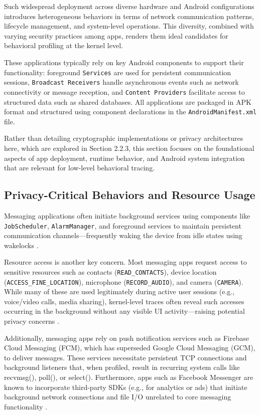 \documentclass[a4paper,12pt]{report}
\begin{document}
Such widespread deployment across diverse hardware and Android configurations introduces heterogeneous behaviors in terms of network communication patterns, lifecycle management, and system-level operations. This diversity, combined with varying security practices among apps, renders them ideal candidates for behavioral profiling at the kernel level.

These applications typically rely on key Android components to support their functionality: foreground \texttt{Services} are used for persistent communication sessions, \texttt{Broadcast Receivers} handle asynchronous events such as network connectivity or message reception, and \texttt{Content Providers} facilitate access to structured data such as shared databases. All applications are packaged in APK format and structured using component declarations in the \texttt{AndroidManifest.xml} file.

Rather than detailing cryptographic implementations or privacy architectures here, which are explored in Section 2.2.3, this section focuses on the foundational aspects of app deployment, runtime behavior, and Android system integration that are relevant for low-level behavioral tracing.

\subsection{Privacy-Critical Behaviors and Resource Usage}
Messaging applications often initiate background services using components like \texttt{JobScheduler}, \texttt{AlarmManager}, and foreground services to maintain persistent communication channels—frequently waking the device from idle states using wakelocks \cite{androidwakelocks}.

Resource access is another key concern. Most messaging apps request access to sensitive resources such as contacts (\texttt{READ\_CONTACTS}), device location (\texttt{ACCESS\_FINE\_LOCATION}), microphone (\texttt{RECORD\_AUDIO}), and camera (\texttt{CAMERA}). While many of these are used legitimately during active user sessions (e.g., voice/video calls, media sharing), kernel-level traces often reveal such accesses occurring in the background without any visible UI activity—raising potential privacy concerns \cite{reardon2019leakage}.

Additionally, messaging apps rely on push notification services such as Firebase Cloud Messaging (FCM), which has superseded Google Cloud Messaging (GCM), to deliver messages. These services necessitate persistent TCP connections and background listeners that, when profiled, result in recurring system calls like recvmsg(), poll(), or select(). Furthermore, apps such as Facebook Messenger are known to incorporate third-party SDKs (e.g., for analytics or ads) that initiate background network connections and file I/O unrelated to core messaging functionality \cite{pi2018metadata}.
\end{document}
